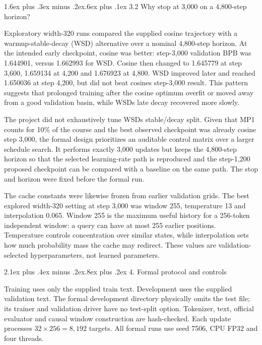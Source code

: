 \documentclass[11pt]{article}
\makeatletter
\renewcommand\section{\@startsection{section}{1}{0pt}%
  {2.1ex plus .4ex minus .2ex}{.8ex plus .2ex}%
  {\normalfont\large\bfseries}}
\renewcommand\subsection{\@startsection{subsection}{2}{0pt}%
  {1.6ex plus .3ex minus .2ex}{.6ex plus .1ex}%
  {\normalfont\normalsize\bfseries}}
\makeatother
\begin{document}
\subsection{3.2 Why stop at 3,000 on a 4,800-step
horizon?}\label{32-why-stop-at-3000-on-a-4800-step-horizon}

Exploratory width-320 runs compared the supplied cosine trajectory with
a warmup-stable-decay (WSD) alternative over a nominal 4,800-step
horizon. At the intended early checkpoint, cosine was better: step-3,000
validation BPB was 1.644901, versus 1.662993 for WSD. Cosine then
changed to 1.645779 at step 3,600, 1.659134 at 4,200 and 1.676923 at
4,800. WSD improved later and reached 1.650036 at step 4,200, but did
not beat cosine\textquotesingle s step-3,000 result. This pattern
suggests that prolonged training after the cosine optimum overfit or
moved away from a good validation basin, while WSD\textquotesingle s
late decay recovered more slowly.

The project did not exhaustively tune WSD\textquotesingle s stable/decay
split. Given that MP1 counts for 10\% of the course and the best
observed checkpoint was already cosine step 3,000, the formal design
prioritizes an auditable control matrix over a larger schedule search.
It performs exactly 3,000 updates but keeps the 4,800-step horizon so
that the selected learning-rate path is reproduced and the step-1,200
proposed checkpoint can be compared with a baseline on the same path.
The stop and horizon were fixed before the formal run.

The cache constants were likewise frozen from earlier validation grids.
The best explored width-320 setting at step 3,000 was window 255,
temperature 13 and interpolation 0.065. Window 255 is the maximum useful
history for a 256-token independent window: a query can have at most 255
earlier positions. Temperature controls concentration over similar
states, while interpolation sets how much probability mass the cache may
redirect. These values are validation-selected hyperparameters, not
learned parameters.

\section{4. Formal protocol and
controls}\label{4-formal-protocol-and-controls}

Training uses only the supplied train text. Development uses the
supplied validation text. The formal development directory physically
omits the test file; its trainer and validation driver have no
test-split option. Tokenizer, text, official evaluator and causal window
construction are hash-checked. Each update processes
\(32\times256=8,192\) targets. All formal runs use seed 7506, CPU FP32
and four threads.
\end{document}
